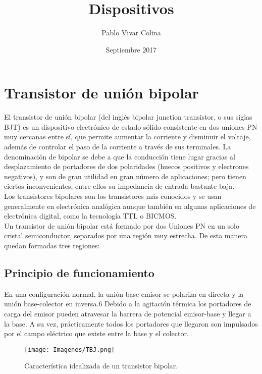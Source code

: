 \documentclass{article}
\title{Dispositivos}
\author{Pablo Vivar Colina}
\date{Septiembre 2017}
\begin{document}


\section{Transistor de unión bipolar}

El transistor de unión bipolar (del inglés bipolar junction transistor, o sus siglas BJT) es un dispositivo electrónico de estado sólido consistente en dos uniones PN muy cercanas entre sí, que permite aumentar la corriente y disminuir el voltaje, además de controlar el paso de la corriente a través de sus terminales. La denominación de bipolar se debe a que la conducción tiene lugar gracias al desplazamiento de portadores de dos polaridades (huecos positivos y electrones negativos), y son de gran utilidad en gran número de aplicaciones; pero tienen ciertos inconvenientes, entre ellos su impedancia de entrada bastante baja.\citep{TBJwiki}\\

Los transistores bipolares son los transistores más conocidos y se usan generalmente en electrónica analógica aunque también en algunas aplicaciones de electrónica digital, como la tecnología TTL o BICMOS.\citep{TBJwiki}\\

Un transistor de unión bipolar está formado por dos Uniones PN en un solo cristal semiconductor, separados por una región muy estrecha. De esta manera quedan formadas tres regiones:\citep{TBJwiki}\\

\subsection{Principio de funcionamiento}

En una configuración normal, la unión base-emisor se polariza en directa y la unión base-colector en inversa.6​ Debido a la agitación térmica los portadores de carga del emisor pueden atravesar la barrera de potencial emisor-base y llegar a la base. A su vez, prácticamente todos los portadores que llegaron son impulsados por el campo eléctrico que existe entre la base y el colector.\citep{TBJwiki}\\

\begin{figure}[h!]
    \centering
    \texttt{[image: Imagenes/TBJ.png]}
    \caption{Característica idealizada de un transistor bipolar.}
    \label{fig:curvaTBJ}
\end{figure}
\end{document}
